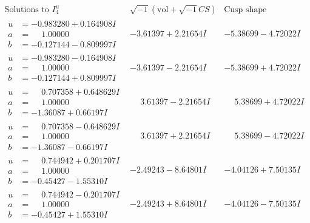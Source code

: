 \documentclass[1p]{elsarticle_modified}
\theoremstyle{definition}
\newcommand{\I}{\sqrt{-1}}
\begin{document}
$$\begin{array}{c|c|c}  
\text{Solutions to }I^u_{4}& \I (\text{vol} + \sqrt{-1}CS) & \text{Cusp shape}\\
 \hline 
\begin{aligned}
u &= -0.983280 + 0.164908 I \\
a &= \phantom{-}1.00000\phantom{ +0.000000I} \\
b &= -0.127144 - 0.809997 I\end{aligned}
 & -3.61397 + 2.21654 I & -5.38699 - 4.72022 I \\ \hline\begin{aligned}
u &= -0.983280 - 0.164908 I \\
a &= \phantom{-}1.00000\phantom{ +0.000000I} \\
b &= -0.127144 + 0.809997 I\end{aligned}
 & -3.61397 - 2.21654 I & -5.38699 + 4.72022 I \\ \hline\begin{aligned}
u &= \phantom{-}0.707358 + 0.648629 I \\
a &= \phantom{-}1.00000\phantom{ +0.000000I} \\
b &= -1.36087 + 0.66197 I\end{aligned}
 & \phantom{-}3.61397 - 2.21654 I & \phantom{-}5.38699 + 4.72022 I \\ \hline\begin{aligned}
u &= \phantom{-}0.707358 - 0.648629 I \\
a &= \phantom{-}1.00000\phantom{ +0.000000I} \\
b &= -1.36087 - 0.66197 I\end{aligned}
 & \phantom{-}3.61397 + 2.21654 I & \phantom{-}5.38699 - 4.72022 I \\ \hline\begin{aligned}
u &= \phantom{-}0.744942 + 0.201707 I \\
a &= \phantom{-}1.00000\phantom{ +0.000000I} \\
b &= -0.45427 - 1.55310 I\end{aligned}
 & -2.49243 - 8.64801 I & -4.04126 + 7.50135 I \\ \hline\begin{aligned}
u &= \phantom{-}0.744942 - 0.201707 I \\
a &= \phantom{-}1.00000\phantom{ +0.000000I} \\
b &= -0.45427 + 1.55310 I\end{aligned}
 & -2.49243 + 8.64801 I & -4.04126 - 7.50135 I \\ \hline\begin{aligned}

\end{aligned}
\end{array}$$
\end{document}
